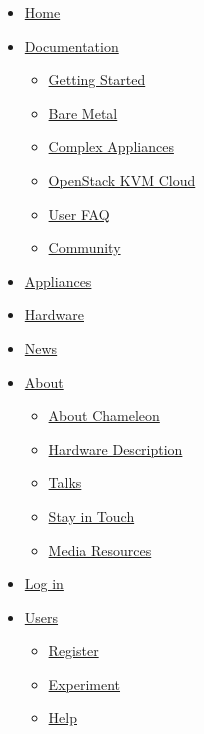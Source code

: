 \begin{itemize}
\item
  \href{https://www.chameleoncloud.org/}{Home}
\item
  \href{openstack-kvm-user-guide.html\#}{Documentation }

  \begin{itemize}
    \item
    \href{https://www.chameleoncloud.org/docs/getting-started/}{Getting
    Started}
  \item
    \href{https://www.chameleoncloud.org/docs/bare-metal-user-guide/}{Bare
    Metal}
  \item
    \href{https://www.chameleoncloud.org/docs/complex-appliances/}{Complex
    Appliances}
  \item
    \href{https://www.chameleoncloud.org/docs/openstack-kvm-cloud/}{OpenStack
    KVM Cloud}
  \item
    \href{https://www.chameleoncloud.org/docs/user-faq/}{User FAQ}
  \item
    \href{https://www.chameleoncloud.org/docs/community/}{Community}
  \end{itemize}
\item
  \href{https://www.chameleoncloud.org/appliances/}{Appliances}
\item
  \href{https://www.chameleoncloud.org/hardware/}{Hardware}
\item
  \href{https://www.chameleoncloud.org/news/}{News}
\item
  \href{openstack-kvm-user-guide.html\#}{About }

  \begin{itemize}
    \item
    \href{https://www.chameleoncloud.org/about/chameleon/}{About
    Chameleon}
  \item
    \href{https://www.chameleoncloud.org/about/hardware-description/}{Hardware
    Description}
  \item
    \href{https://www.chameleoncloud.org/talks/}{Talks}
  \item
    \href{https://www.chameleoncloud.org/about/newsletter/}{Stay in
    Touch}
  \item
    \href{https://www.chameleoncloud.org/about/media-resources/}{Media
    Resources}
  \end{itemize}
\end{itemize}

\begin{itemize}
\item
  \href{https://www.chameleoncloud.org/login/}{Log in}
\item
  \href{openstack-kvm-user-guide.html\#}{Users}

  \begin{itemize}
    \item
    \href{https://www.chameleoncloud.org/user/register/}{Register}
  \item
    \href{https://www.chameleoncloud.org/docs/getting-started/experiment-quickstart/}{Experiment}
  \item
    \href{https://www.chameleoncloud.org/user/help/ticket/new/guest/}{Help}
  \end{itemize}
\end{itemize}

